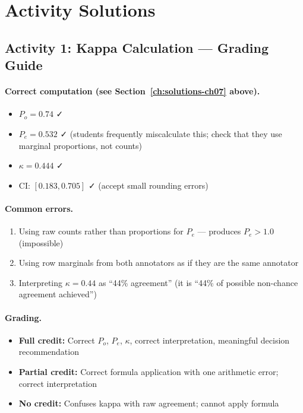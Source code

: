\section{Activity Solutions}

\subsection{Activity 1: Kappa Calculation --- Grading Guide}

\paragraph{Correct computation (see Section~\ref{ch:solutions-ch07} above).}
\begin{itemize}
    \item $P_o = 0.74$ ✓
    \item $P_e = 0.532$ ✓ (students frequently miscalculate this; check that they use marginal proportions, not counts)
    \item $\kappa = 0.444$ ✓
    \item CI: $[0.183, 0.705]$ ✓ (accept small rounding errors)
\end{itemize}

\paragraph{Common errors.}
\begin{enumerate}
    \item Using raw counts rather than proportions for $P_e$ --- produces $P_e > 1.0$ (impossible)
    \item Using row marginals from both annotators as if they are the same annotator
    \item Interpreting $\kappa = 0.44$ as ``44\% agreement'' (it is ``44\% of possible non-chance agreement achieved'')
\end{enumerate}

\paragraph{Grading.}
\begin{itemize}
    \item \textbf{Full credit:} Correct $P_o$, $P_e$, $\kappa$, correct interpretation, meaningful decision recommendation
    \item \textbf{Partial credit:} Correct formula application with one arithmetic error; correct interpretation
    \item \textbf{No credit:} Confuses kappa with raw agreement; cannot apply formula
\end{itemize}

